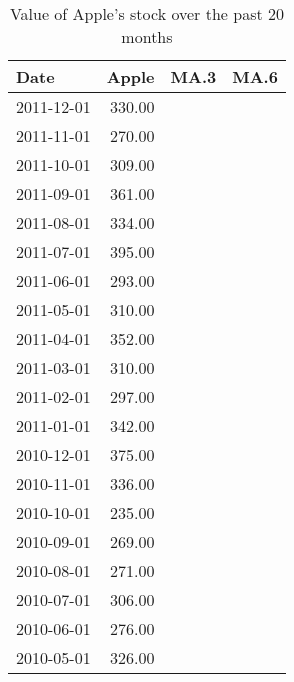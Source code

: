 \documentclass[11pt]{exam}
\begin{document}
\begin{table}[ht]
\begin{center}
\begin{tabular}{lrll}
  \hline
Date & Apple & MA.3 & MA.6 \\ 
  \hline
2011-12-01 & 330.00 &  &  \\ 
  2011-11-01 & 270.00 &  &  \\ 
  2011-10-01 & 309.00 &  &  \\ 
  2011-09-01 & 361.00 &  &  \\ 
  2011-08-01 & 334.00 &  &  \\ 
  2011-07-01 & 395.00 &  &  \\ 
  2011-06-01 & 293.00 &  &  \\ 
  2011-05-01 & 310.00 &  &  \\ 
  2011-04-01 & 352.00 &  &  \\ 
  2011-03-01 & 310.00 &  &  \\ 
  2011-02-01 & 297.00 &  &  \\ 
  2011-01-01 & 342.00 &  &  \\ 
  2010-12-01 & 375.00 &  &  \\ 
  2010-11-01 & 336.00 &  &  \\ 
  2010-10-01 & 235.00 &  &  \\ 
  2010-09-01 & 269.00 &  &  \\ 
  2010-08-01 & 271.00 &  &  \\ 
  2010-07-01 & 306.00 &  &  \\ 
  2010-06-01 & 276.00 &  &  \\ 
  2010-05-01 & 326.00 &  &  \\ 
   \hline
\end{tabular}
\caption{Value of Apple's stock over the past 20 months}
\label{tab:apple}
\end{center}
\end{table}
\end{document}
